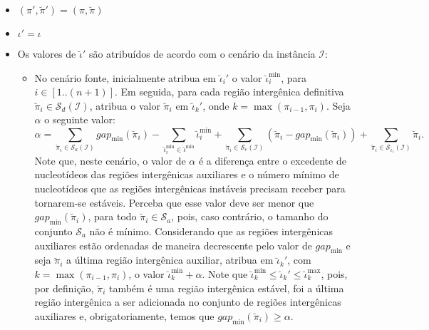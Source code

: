 \begin{itemize}
  \item $(\pi',\breve\pi') = (\pi,\breve\pi)$
  \item $\iota' = \iota$
  \item Os valores de $\breve\iota'$ são atribuídos de acordo com o cenário da instância $\mathcal{I}$:
  \begin{itemize}
    \item No cenário fonte, inicialmente atribua em $\breve\iota_{i}'$ o valor $\breve\iota^{\min}_i$, para $i \in [1..({n+1})]$. Em seguida, para cada região intergênica definitiva $\breve\pi_i \in \mathcal{S}_{d}(\mathcal{I})$, atribua o valor $\breve\pi_i$ em $\breve\iota_{k}'$, onde $k = \max(\pi_{i-1},\pi_i)$. Seja $\alpha$ o seguinte valor:
    $$\alpha = \sum_{\breve\pi_i \in \mathcal{S}_{a}(\mathcal{I})} gap_{\min}(\breve\pi_i) - \sum_{\breve\iota_{i}^{\min}  \in \breve\iota^{\min}} \breve\iota_{i}^{\min} + \sum_{\breve\pi_i \in \mathcal{S}_{e}(\mathcal{I})} (\breve\pi_i - gap_{\min}(\breve\pi_i)) + \sum_{\breve\pi_i \in \mathcal{S}_{i_{1}}(\mathcal{I})} \breve\pi_i.$$
    Note que, neste cenário, o valor de $\alpha$ é a diferença entre o excedente de nucleotídeos das regiões intergênicas auxiliares e o número mínimo de nucleotídeos que as regiões intergênicas instáveis precisam receber para tornarem-se estáveis. Perceba que esse valor deve ser menor que $gap_{\min}(\breve\pi_i)$, para todo $\breve\pi_i \in \mathcal{S}_{a}$, pois, caso contrário, o tamanho do conjunto $\mathcal{S}_{a}$ não é mínimo. Considerando que as regiões intergênicas auxiliares estão ordenadas de maneira decrescente pelo valor de $gap_{\min}$ e seja $\breve\pi_i$ a última região intergênica auxiliar, atribua em $\breve\iota_{k}'$, com $k = \max(\pi_{i-1},\pi_i)$, o valor $\breve\iota^{\min}_k + \alpha$. Note que $\breve\iota^{\min}_k \le \breve\iota_{k}' \le \breve\iota^{\max}_k$, pois, por definição, $\breve\pi_i$ também é uma região intergênica estável, foi a última região intergênica a ser adicionada no conjunto de regiões intergênicas auxiliares e, obrigatoriamente, temos que $gap_{\min}(\breve\pi_i) \ge \alpha$.
    

\end{itemize}
\end{itemize}
